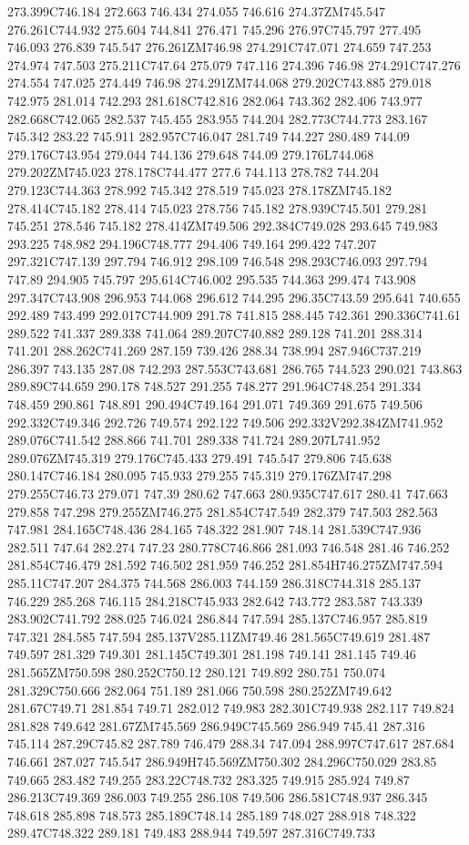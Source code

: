 273.399C746.184 272.663 746.434 274.055 746.616 274.37ZM745.547 276.261C744.932 275.604 744.841 276.471 745.296 276.97C745.797 277.495 746.093 276.839 745.547 276.261ZM746.98 274.291C747.071 274.659 747.253 274.974 747.503 275.211C747.64 275.079 747.116 274.396 746.98 274.291C747.276 274.554 747.025 274.449 746.98 274.291ZM744.068 279.202C743.885 279.018 742.975 281.014 742.293 281.618C742.816 282.064 743.362 282.406 743.977 282.668C742.065 282.537 745.455 283.955 744.204 282.773C744.773 283.167 745.342 283.22 745.911 282.957C746.047 281.749 744.227 280.489 744.09 279.176C743.954 279.044 744.136 279.648 744.09 279.176L744.068 279.202ZM745.023 278.178C744.477 277.6 744.113 278.782 744.204 279.123C744.363 278.992 745.342 278.519 745.023 278.178ZM745.182 278.414C745.182 278.414 745.023 278.756 745.182 278.939C745.501 279.281 745.251 278.546 745.182 278.414ZM749.506 292.384C749.028 293.645 749.983 293.225 748.982 294.196C748.777 294.406 749.164 299.422 747.207 297.321C747.139 297.794 746.912 298.109 746.548 298.293C746.093 297.794 747.89 294.905 745.797 295.614C746.002 295.535 744.363 299.474 743.908 297.347C743.908 296.953 744.068 296.612 744.295 296.35C743.59 295.641 740.655 292.489 743.499 292.017C744.909 291.78 741.815 288.445 742.361 290.336C741.61 289.522 741.337 289.338 741.064 289.207C740.882 289.128 741.201 288.314 741.201 288.262C741.269 287.159 739.426 288.34 738.994 287.946C737.219 286.397 743.135 287.08 742.293 287.553C743.681 286.765 744.523 290.021 743.863 289.89C744.659 290.178 748.527 291.255 748.277 291.964C748.254 291.334 748.459 290.861 748.891 290.494C749.164 291.071 749.369 291.675 749.506 292.332C749.346 292.726 749.574 292.122 749.506 292.332V292.384ZM741.952 289.076C741.542 288.866 741.701 289.338 741.724 289.207L741.952 289.076ZM745.319 279.176C745.433 279.491 745.547 279.806 745.638 280.147C746.184 280.095 745.933 279.255 745.319 279.176ZM747.298 279.255C746.73 279.071 747.39 280.62 747.663 280.935C747.617 280.41 747.663 279.858 747.298 279.255ZM746.275 281.854C747.549 282.379 747.503 282.563 747.981 284.165C748.436 284.165 748.322 281.907 748.14 281.539C747.936 282.511 747.64 282.274 747.23 280.778C746.866 281.093 746.548 281.46 746.252 281.854C746.479 281.592 746.502 281.959 746.252 281.854H746.275ZM747.594 285.11C747.207 284.375 744.568 286.003 744.159 286.318C744.318 285.137 746.229 285.268 746.115 284.218C745.933 282.642 743.772 283.587 743.339 283.902C741.792 288.025 746.024 286.844 747.594 285.137C746.957 285.819 747.321 284.585 747.594 285.137V285.11ZM749.46 281.565C749.619 281.487 749.597 281.329 749.301 281.145C749.301 281.198 749.141 281.145 749.46 281.565ZM750.598 280.252C750.12 280.121 749.892 280.751 750.074 281.329C750.666 282.064 751.189 281.066 750.598 280.252ZM749.642 281.67C749.71 281.854 749.71 282.012 749.983 282.301C749.938 282.117 749.824 281.828 749.642 281.67ZM745.569 286.949C745.569 286.949 745.41 287.316 745.114 287.29C745.82 287.789 746.479 288.34 747.094 288.997C747.617 287.684 746.661 287.027 745.547 286.949H745.569ZM750.302 284.296C750.029 283.85 749.665 283.482 749.255 283.22C748.732 283.325 749.915 285.924 749.87 286.213C749.369 286.003 749.255 286.108 749.506 286.581C748.937 286.345 748.618 285.898 748.573 285.189C748.14 285.189 748.027 288.918 748.322 289.47C748.322 289.181 749.483 288.944 749.597 287.316C749.733 